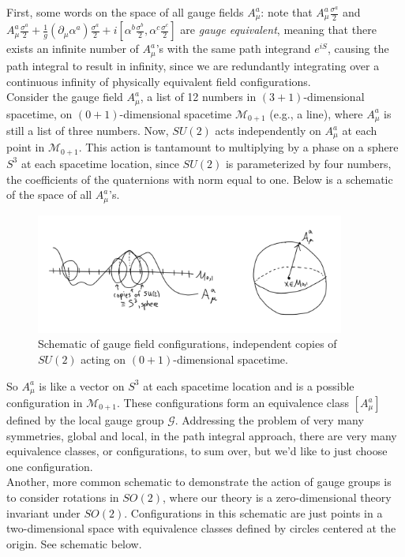 \noindent First, some words on the space of all gauge fields $A_\mu^a$: note that $A_\mu^a \frac{\sigma^a}{2}$ and $A_\mu^a \frac{\sigma^a}{2} + \frac{1}{g} (\partial_\mu \alpha^a) \frac{\sigma^a}{2} + i [\alpha^b \frac{\sigma^b}{2}, \alpha^c \frac{\sigma^c}{2}]$ are \textit{gauge equivalent}, meaning that there exists an infinite number of $A_\mu^a$'s with the same path integrand $e^{i S}$, causing the path integral to result in infinity, since we are redundantly integrating over a continuous infinity of physically equivalent field configurations. \\

\noindent Consider the gauge field $A_\mu^a$, a list of 12 numbers in $(3+1)$-dimensional spacetime, on $(0+1)$-dimensional spacetime $\mathcal{M}_{0+1}$ (e.g., a line), where $A_\mu^a$ is still a list of three numbers. Now, $SU(2)$ acts independently on $A_\mu^a$ at each point in $\mathcal{M}_{0+1}$. This action is tantamount to multiplying by a phase on a sphere $S^3$ at each spacetime location, since $SU(2)$ is parameterized by four numbers, the coefficients of the quaternions with norm equal to one. Below is a schematic of the space of all $A_\mu^a$'s. \\

\begin{figure}[H]
	\centering
	\includegraphics[width=4in]{images/su2schematic.png}
	\caption*{Schematic of gauge field configurations, independent copies of $SU(2)$ acting on $(0+1)$-dimensional spacetime.}
\end{figure}

\noindent So $A_\mu^a$ is like a vector on $S^3$ at each spacetime location and is a possible configuration in $\mathcal{M}_{0+1}$. These configurations form an equivalence class  $[A_\mu^a]$ defined by the local gauge group $\mathcal{G}$. Addressing the problem of very many symmetries, global and local,  in the path integral approach, there are very many equivalence classes, or configurations, to sum over, but we'd like to just choose one configuration. \\

\noindent Another, more common schematic to demonstrate the action of gauge groups is to consider rotations in $SO(2)$, where our theory is a zero-dimensional theory invariant under $SO(2)$. Configurations in this schematic are just points in a two-dimensional space with equivalence classes defined by circles centered at the origin. See schematic below. \\

